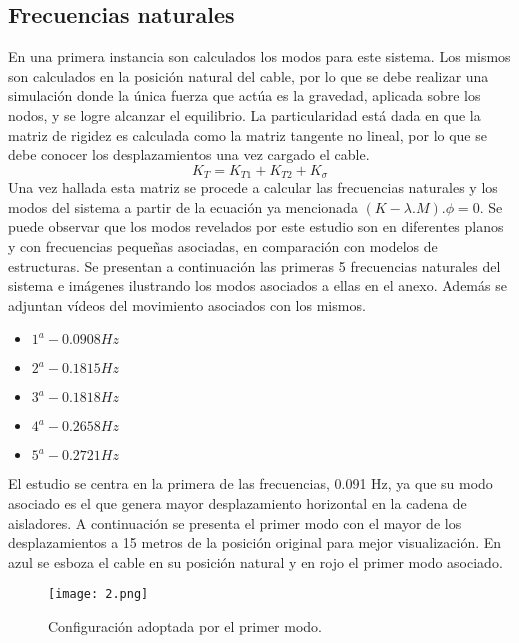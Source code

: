 \subsection{Frecuencias naturales}
En una primera instancia son calculados los modos para este sistema. Los mismos son calculados en la posición natural del cable, por lo que se debe realizar una simulación donde la única fuerza que actúa es la gravedad, aplicada sobre los nodos, y se logre alcanzar el equilibrio. La particularidad está dada en que la matriz de rigidez es calculada como la matriz tangente no lineal, por lo que se debe conocer los desplazamientos una vez cargado el cable.
\begin{equation}
	K_T=K_{T1}+K_{T2}+K_{\sigma} 
\end{equation}
Una vez hallada esta matriz se procede a calcular las frecuencias naturales y los modos del sistema a partir de la ecuación ya mencionada $(K-\lambda.M).\phi = 0$. Se puede observar que los modos revelados por este estudio son en diferentes planos y con frecuencias pequeñas asociadas, en comparación con modelos de estructuras.
Se presentan a continuación las primeras 5 frecuencias naturales del sistema e imágenes ilustrando los modos asociados a ellas en el anexo. Además se adjuntan vídeos del movimiento asociados con los mismos.
\begin{itemize}
	\item $1^a - 0.0908 Hz$
	\item $2^a - 0.1815 Hz$
	\item $3^a - 0.1818 Hz$
	\item $4^a - 0.2658 Hz$
	\item $5^a - 0.2721 Hz$
\end{itemize}



El estudio se centra en la primera de las frecuencias, 0.091 Hz, ya que su modo asociado es el que genera mayor desplazamiento horizontal en la cadena de aisladores. A continuación se presenta el primer modo con el mayor de los desplazamientos a 15 metros de la posición original para mejor visualización. En azul se esboza el cable en su posición natural y en rojo el primer modo asociado.

\begin{figure}[h]
	\centering
	\label{2}
	\texttt{[image: 2.png]}
	\caption{Configuración adoptada por el primer modo.}
\end{figure}




